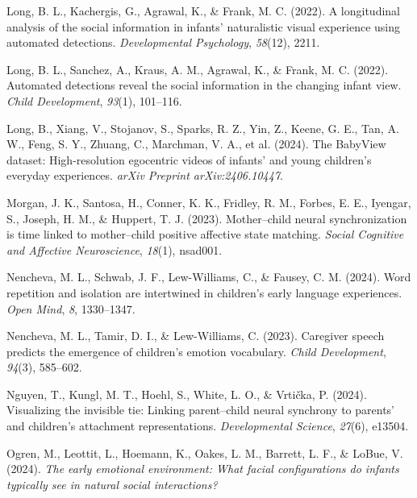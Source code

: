 \documentclass[10pt, letterpaper]{article}
\begin{document}
\begin{CSLReferences}{1}{0}
Long, B. L., Kachergis, G., Agrawal, K., \& Frank, M. C. (2022). A
longitudinal analysis of the social information in infants' naturalistic
visual experience using automated detections. \emph{Developmental
Psychology}, \emph{58}(12), 2211.

Long, B. L., Sanchez, A., Kraus, A. M., Agrawal, K., \& Frank, M. C.
(2022). Automated detections reveal the social information in the
changing infant view. \emph{Child Development}, \emph{93}(1), 101--116.

Long, B., Xiang, V., Stojanov, S., Sparks, R. Z., Yin, Z., Keene, G. E.,
Tan, A. W., Feng, S. Y., Zhuang, C., Marchman, V. A., et al. (2024). The
BabyView dataset: High-resolution egocentric videos of infants' and
young children's everyday experiences. \emph{arXiv Preprint
arXiv:2406.10447}.

Morgan, J. K., Santosa, H., Conner, K. K., Fridley, R. M., Forbes, E.
E., Iyengar, S., Joseph, H. M., \& Huppert, T. J. (2023). Mother--child
neural synchronization is time linked to mother--child positive
affective state matching. \emph{Social Cognitive and Affective
Neuroscience}, \emph{18}(1), nsad001.

Nencheva, M. L., Schwab, J. F., Lew-Williams, C., \& Fausey, C. M.
(2024). Word repetition and isolation are intertwined in children's
early language experiences. \emph{Open Mind}, \emph{8}, 1330--1347.

Nencheva, M. L., Tamir, D. I., \& Lew-Williams, C. (2023). Caregiver
speech predicts the emergence of children's emotion vocabulary.
\emph{Child Development}, \emph{94}(3), 585--602.

Nguyen, T., Kungl, M. T., Hoehl, S., White, L. O., \& Vrtička, P.
(2024). Visualizing the invisible tie: Linking parent--child neural
synchrony to parents' and children's attachment representations.
\emph{Developmental Science}, \emph{27}(6), e13504.

Ogren, M., Leottit, L., Hoemann, K., Oakes, L. M., Barrett, L. F., \&
LoBue, V. (2024). \emph{The early emotional environment: What facial
configurations do infants typically see in natural social interactions?}


\end{CSLReferences}
\end{document}
